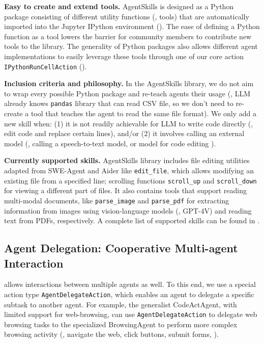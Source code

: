 \textbf{Easy to create and extend tools.} AgentSkills is designed as a Python package consisting of different utility functions (\ie, tools) that are automatically imported into the Jupyter IPython environment ().
The ease of defining a Python function as a tool lowers the barrier for community members to contribute new tools to the library.
The generality of Python packages also allows different agent implementations to easily leverage these tools through one of our core action \texttt{IPythonRunCellAction} ().



\textbf{Inclusion criteria and philosophy.} 
In the AgentSkills library, we do not aim to wrap every possible Python package and re-teach agents their usage (\eg, LLM already knows \texttt{pandas} library that can read CSV file, so we don't need to re-create a tool that teaches the agent to read the same file format).
We only add a new skill when: (1) it is not readily achievable for LLM to write code directly (\eg, edit code and replace certain lines), and/or (2) it involves calling an external model (\eg, calling a speech-to-text model, or model for code editing \citep{speculative_editing}).


\textbf{Currently supported skills.}
AgentSkills library includes file editing utilities adapted from SWE-Agent \citep{yang2024sweagent} and Aider \citep{aider} like \texttt{edit\_file}, which allows modifying an existing file from a specified line; scrolling functions \texttt{scroll\_up} and \texttt{scroll\_down} for viewing a different part of files.
It also contains tools that support reading multi-modal documents, like \texttt{parse\_image} and \texttt{parse\_pdf} for extracting information from images using vision-language models (\eg, GPT-4V) and reading text from PDFs, respectively.
A complete list of supported skills can be found in .

\subsection{Agent Delegation: Cooperative Multi-agent Interaction}
\label{sec:agent-delegation}

\projname allows interactions between multiple agents as well. To this end, we use a special action type \texttt{AgentDelegateAction}, which enables an agent to delegate a specific subtask to another agent.
For example, the generalist CodeActAgent, with limited support for web-browsing, can use \texttt{AgentDelegateAction} to delegate web browsing tasks to the specialized BrowsingAgent to perform more complex browsing activity (\eg, navigate the web, click buttons, submit forms, \etc).


